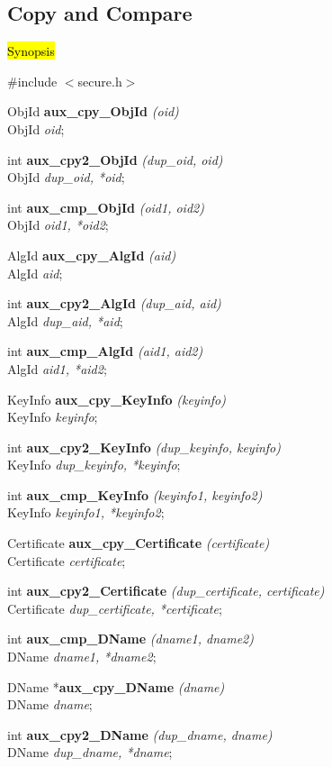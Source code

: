 \subsection{Copy and Compare}
\label{aux_cpy}
\hl{Synopsis}

\#include $<$secure.h$>$
 
ObjId {\bf *aux\_cpy\_ObjId} {\em (oid)} \\
ObjId {\em *oid};

int {\bf aux\_cpy2\_ObjId} {\em (dup\_oid, oid)} \\
ObjId {\em *dup\_oid, *oid};

int {\bf aux\_cmp\_ObjId} {\em (oid1, oid2)} \\
ObjId {\em *oid1, *oid2};

AlgId {\bf *aux\_cpy\_AlgId} {\em (aid)} \\
AlgId {\em *aid};

int {\bf aux\_cpy2\_AlgId} {\em (dup\_aid, aid)} \\
AlgId {\em *dup\_aid, *aid};

int {\bf aux\_cmp\_AlgId} {\em (aid1, aid2)} \\
AlgId {\em *aid1, *aid2};

KeyInfo {\bf *aux\_cpy\_KeyInfo} {\em (keyinfo)} \\
KeyInfo {\em *keyinfo};

int {\bf aux\_cpy2\_KeyInfo} {\em (dup\_keyinfo, keyinfo)} \\
KeyInfo {\em *dup\_keyinfo, *keyinfo};

int {\bf aux\_cmp\_KeyInfo} {\em (keyinfo1, keyinfo2)} \\
KeyInfo {\em *keyinfo1, *keyinfo2};

Certificate {\bf *aux\_cpy\_Certificate} {\em (certificate)} \\
Certificate {\em *certificate};

int {\bf aux\_cpy2\_Certificate} {\em (dup\_certificate, certificate)} \\
Certificate {\em *dup\_certificate, *certificate};

int {\bf aux\_cmp\_DName} {\em  (dname1, dname2)} \\
DName {\em *dname1, *dname2};

DName *{\bf aux\_cpy\_DName} {\em  (dname)} \\
DName {\em *dname};

int {\bf aux\_cpy2\_DName} {\em (dup\_dname, dname)} \\
DName {\em *dup\_dname, *dname};


